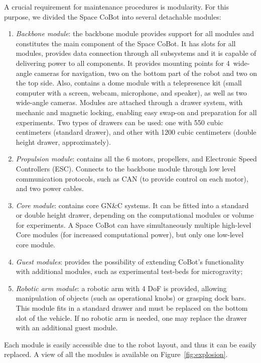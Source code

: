 A crucial requirement for maintenance procedures is modularity. For this purpose, we divided the Space CoBot into several detachable modules:
\begin{enumerate}
	\item \emph{Backbone module}: the backbone module provides support for all modules and constitutes the main component of the Space CoBot. It has slots for all modules, provides data connection through all subsystems and it is capable of delivering power to all components. It provides mounting points for 4~wide-angle cameras for navigation, two on the bottom part of the robot and two on the top side. Also, contains a dome module with a telepresence kit (small computer with a screen, webcam, microphone, and speaker), as well as two wide-angle cameras. Modules are attached through a drawer system, with mechanic and magnetic locking, enabling easy swap-on and preparation for all experiments. Two types of drawers can be used: one with 550 cubic centimeters (standard drawer), and other with 1200 cubic centimeters (double height drawer, approximately). 
	\item \emph{Propulsion module}: contains all the 6 motors, propellers, and Electronic Speed Controllers (ESC). Connects to the backbone module through low level communication protocols, such as CAN (to provide control on each motor), and two power cables.
	\item \emph{Core module}: contains core GN\&C systems. It can be fitted into a standard or double height drawer, depending on the computational modules or volume for experiments. A Space CoBot can have simultaneously multiple high-level Core modules (for increased computational power), but only one low-level core module.
	\item \emph{Guest modules}: provides the possibility of extending CoBot's functionality with additional modules, such as experimental test-beds for microgravity;
	\item \emph{Robotic arm module}: a robotic arm with 4 DoF is provided, allowing manipulation of objects (such as operational knobs) or grasping dock bars. This module fits in a standard drawer and must be replaced on the bottom slot of the vehicle. If no robotic arm is needed, one may replace the drawer with an additional guest module.
\end{enumerate}

Each module is easily accessible due to the robot layout, and thus it can be easily replaced. A view of all the modules is available on Figure~\ref{fig:explosion}.

